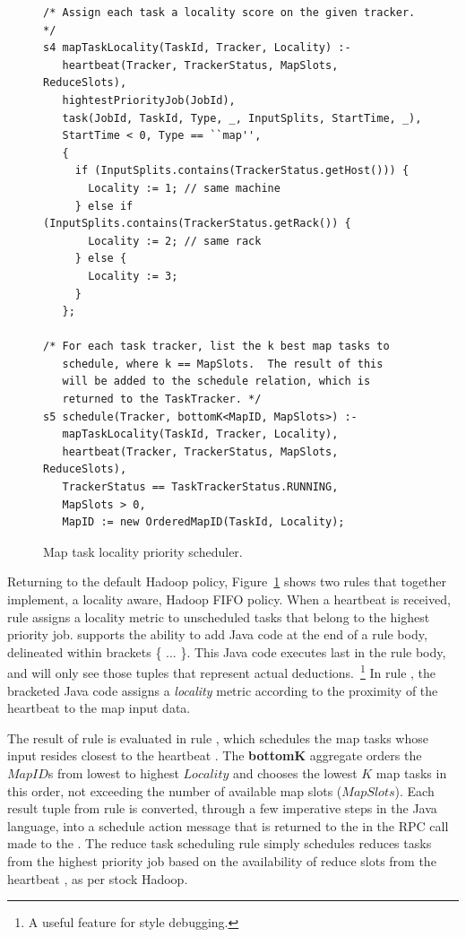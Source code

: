 \begin{figure}
\ssp
\centering
\begin{lstlisting}
/* Assign each task a locality score on the given tracker. */
s4 mapTaskLocality(TaskId, Tracker, Locality) :-
   heartbeat(Tracker, TrackerStatus, MapSlots, ReduceSlots),
   hightestPriorityJob(JobId),
   task(JobId, TaskId, Type, _, InputSplits, StartTime, _),
   StartTime < 0, Type == ``map'',
   {
     if (InputSplits.contains(TrackerStatus.getHost())) { 
       Locality := 1; // same machine
     } else if (InputSplits.contains(TrackerStatus.getRack()) { 
       Locality := 2; // same rack
     } else {
       Locality := 3;
     }
   };
	
/* For each task tracker, list the k best map tasks to 
   schedule, where k == MapSlots.  The result of this 
   will be added to the schedule relation, which is 
   returned to the TaskTracker. */
s5 schedule(Tracker, bottomK<MapID, MapSlots>) :-
   mapTaskLocality(TaskId, Tracker, Locality),
   heartbeat(Tracker, TrackerStatus, MapSlots, ReduceSlots),
   TrackerStatus == TaskTrackerStatus.RUNNING,
   MapSlots > 0,
   MapID := new OrderedMapID(TaskId, Locality);

\end{lstlisting}
\caption{\label{ch:boom:fig:schedule} Map task locality priority scheduler.}
\end{figure}

Returning to the default Hadoop policy, Figure~\ref{ch:boom:fig:schedule} shows
two rules that together implement, a locality aware, Hadoop FIFO policy.  When
a \TT heartbeat is received, rule  assigns a locality metric to
unscheduled tasks that belong to the highest priority job.  \JOL supports the
ability to add Java code at the end of a rule body, delineated within brackets
\{ ...  \}.  This Java code executes last in the rule body, and will only see
those tuples that represent actual deductions.~\footnote{A useful feature for
 style debugging.} In rule , the bracketed Java code assigns
a {\em locality} metric according to the proximity of the heartbeat \TT to the
map input data.

The result of rule  is evaluated in rule , which schedules the
map tasks whose input resides closest to the heartbeat \TT.  The {\bf bottomK}
aggregate orders the $MapID$s from lowest to highest $Locality$ and chooses the
lowest $K$ map tasks in this order, not exceeding the number of available map
slots ($MapSlots$).  Each result tuple from rule  is converted, through
a few imperative steps in the Java language, into a schedule action message
that is returned to the \TT in the RPC call made to the \JT.  The reduce task
scheduling rule simply schedules reduces tasks from the highest priority job
based on the availability of reduce slots from the heartbeat \TT, as per stock
Hadoop.

